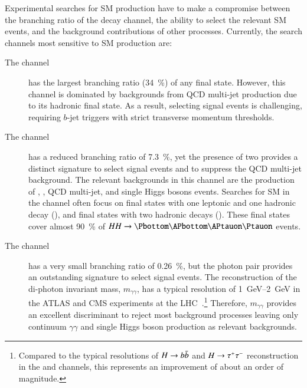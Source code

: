 Experimental searches for SM \HH production have to make a compromise between
the branching ratio of the decay channel, the ability to select the relevant SM
\HH events, and the background contributions of other processes. Currently, the
search channels most sensitive to SM \HH production are:
\begin{description}

\item[The \bbbb channel] has the largest branching ratio (\SI{34}{\percent}) of
  any final state. However, this channel is dominated by backgrounds from QCD
  multi-jet production due to its hadronic final state. As a result, selecting
  signal events is challenging, requiring $b$-jet triggers with strict
  transverse momentum thresholds.

\item[The \bbtautau channel] has a reduced branching ratio of
  \SI{7.3}{\percent}, yet the presence of two \tauleptons provides a distinct
  signature to select signal events and to suppress the QCD multi-jet
  background. The relevant backgrounds in this channel are the production of
  \ttbar, \Zjets, QCD multi-jet, and single Higgs bosons events. Searches for SM
  \HH in the \bbtautau channel often focus on final states with one leptonic and
  one hadronic \taulepton decay (\lephad), and final states with two hadronic
  \taulepton decays (\hadhad). These final states cover almost \SI{90}{\percent}
  of $HH \to \bbtautau$ events.

\item[The \bbyy channel] has a very small branching ratio of
  \SI{0.26}{\percent}, but the photon pair provides an outstanding signature to
  select signal events. The reconstruction of the di-photon invariant mass,
  $m_{\gamma\gamma}$, has a typical resolution of \SIrange{1}{2}{\GeV} in the
  ATLAS and CMS experiments at the
  LHC~\cite{PERF-2007-01,CMS-CMS-00-001}.\footnote{Compared to the typical
    resolutions of $H \to b\bar{b}$ and $H \to \tau^{+} \tau^{-}$ reconstruction in the
    \bbbb and \bbtautau channels, this represents an improvement of about an
    order of magnitude.} Therefore, $m_{\gamma\gamma}$ provides an excellent
  discriminant to reject most background processes leaving only continuum
  $\gamma\gamma$ and single Higgs boson production as relevant backgrounds.

\end{description}

